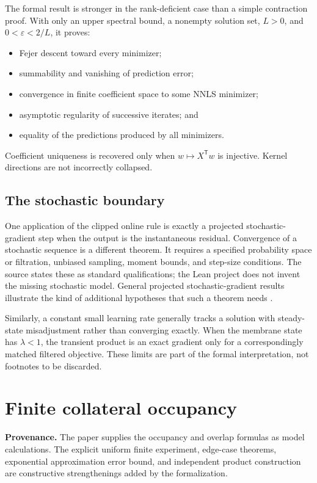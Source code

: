 \documentclass[11pt,a4paper]{article}
\begin{document}
The formal result is stronger in the rank-deficient case than a simple
contraction proof. With only an upper spectral bound, a nonempty solution
set, \(L>0\), and \(0<\varepsilon<2/L\), it proves:

\begin{itemize}
  \item Fejer descent toward every minimizer;
  \item summability and vanishing of prediction error;
  \item convergence in finite coefficient space to some NNLS minimizer;
  \item asymptotic regularity of successive iterates; and
  \item equality of the predictions produced by all minimizers.
\end{itemize}

Coefficient uniqueness is recovered only when \(w\mapsto X^\mathsf{T}w\)
is injective. Kernel directions are not incorrectly collapsed.

\subsection{The stochastic boundary}

One application of the clipped online rule is exactly a projected
stochastic-gradient step when the output is the instantaneous residual.
Convergence of a stochastic sequence is a different theorem. It requires a
specified probability space or filtration, unbiased sampling, moment
bounds, and step-size conditions. The source states these as standard
qualifications; the Lean project does not invent the missing stochastic
model. General projected stochastic-gradient results illustrate the kind of
additional hypotheses that such a theorem needs \cite{geiersbach2019}.

Similarly, a constant small learning rate generally tracks a solution with
steady-state misadjustment rather than converging exactly. When the membrane
state has \(\lambda<1\), the transient product is an exact gradient only for
a correspondingly matched filtered objective. These limits are part of the
formal interpretation, not footnotes to be discarded.

\section{Finite collateral occupancy}
\label{sec:occupancy}

\textbf{Provenance.} The paper supplies the occupancy and overlap formulas as
model calculations. The explicit uniform finite experiment, edge-case
theorems, exponential approximation error bound, and independent product
construction are constructive strengthenings added by the formalization.
\end{document}
